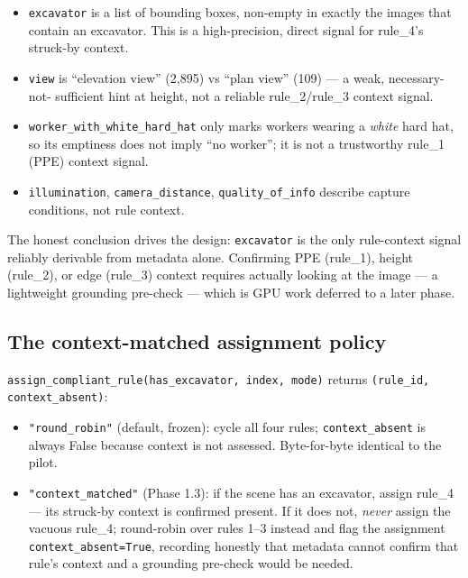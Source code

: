 \begin{itemize}
  \item \texttt{excavator} is a list of bounding boxes, non-empty in exactly the images that contain an
  excavator. This is a high-precision, direct signal for rule\_4's struck-by context.
  \item \texttt{view} is ``elevation view'' (2{,}895) vs ``plan view'' (109) --- a weak, necessary-not-
  sufficient hint at height, not a reliable rule\_2/rule\_3 context signal.
  \item \texttt{worker\_with\_white\_hard\_hat} only marks workers wearing a \emph{white} hard hat, so
  its emptiness does not imply ``no worker''; it is not a trustworthy rule\_1 (PPE) context signal.
  \item \texttt{illumination}, \texttt{camera\_distance}, \texttt{quality\_of\_info} describe capture
  conditions, not rule context.
\end{itemize}

The honest conclusion drives the design: \texttt{excavator} is the only rule-context signal reliably
derivable from metadata alone. Confirming PPE (rule\_1), height (rule\_2), or edge (rule\_3) context
requires actually looking at the image --- a lightweight grounding pre-check --- which is GPU work
deferred to a later phase.

\subsection{The context-matched assignment policy}

\texttt{assign\_compliant\_rule(has\_excavator, index, mode)} returns
\texttt{(rule\_id, context\_absent)}:

\begin{itemize}
  \item \texttt{"round\_robin"} (default, frozen): cycle all four rules; \texttt{context\_absent} is
  always False because context is not assessed. Byte-for-byte identical to the pilot.
  \item \texttt{"context\_matched"} (Phase 1.3): if the scene has an excavator, assign rule\_4 --- its
  struck-by context is confirmed present. If it does not, \emph{never} assign the vacuous rule\_4;
  round-robin over rules 1--3 instead and flag the assignment \texttt{context\_absent=True}, recording
  honestly that metadata cannot confirm that rule's context and a grounding pre-check would be needed.
\end{itemize}

